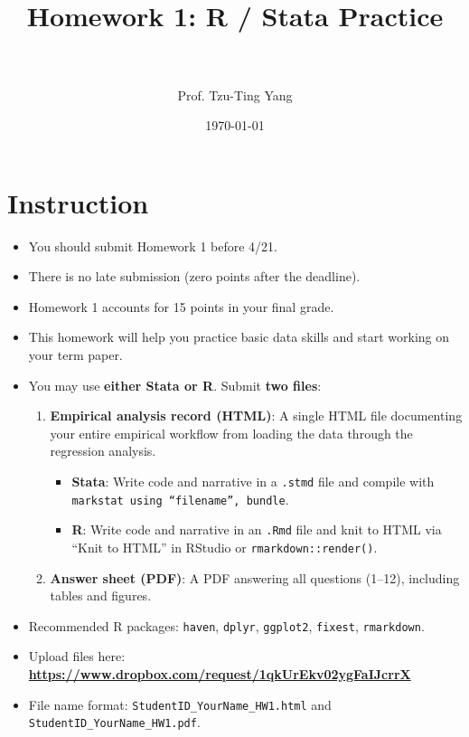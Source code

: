 \documentclass[paper=a4, fontsize=11pt]{scrartcl}
\title{
\normalfont \normalsize
\horrule{0.5pt} \\[0.4cm]
\huge Homework 1: R / Stata Practice \\
\horrule{2pt} \\[0.5cm]
}
\author{Prof. Tzu-Ting Yang}
\date{\normalsize\today}
\begin{document}
\maketitle




\section*{Instruction}

\begin{itemize}
\item[\textbullet] You should submit Homework 1 before 4/21.
\item[\textbullet] There is no late submission (zero points after the deadline).
\item[\textbullet] Homework 1 accounts for 15 points in your final grade.
\item[\textbullet] This homework will help you practice basic data skills and start working on your term paper.
\item[\textbullet] You may use \textbf{either Stata or R}. Submit \textbf{two files}:
  \begin{enumerate}
    \item \textbf{Empirical analysis record (HTML)}: A single HTML file documenting your entire empirical workflow from loading the data through the regression analysis.
    \begin{itemize}
      \item \textbf{Stata}: Write code and narrative in a \texttt{.stmd} file and compile with \texttt{markstat using ``filename'', bundle}.
      \item \textbf{R}: Write code and narrative in an \texttt{.Rmd} file and knit to HTML via ``Knit to HTML'' in RStudio or \texttt{rmarkdown::render()}.
    \end{itemize}
    \item \textbf{Answer sheet (PDF)}: A PDF answering all questions (1--12), including tables and figures.
  \end{enumerate}
\item[\textbullet] Recommended R packages: \texttt{haven}, \texttt{dplyr}, \texttt{ggplot2}, \texttt{fixest}, \texttt{rmarkdown}.
\item[\textbullet] Upload files here: \textbf{\url{https://www.dropbox.com/request/1qkUrEkv02ygFaIJcrrX}}
\item[\textbullet] File name format: \texttt{StudentID\_YourName\_HW1.html} and \texttt{StudentID\_YourName\_HW1.pdf}.
\end{itemize}
\end{document}

